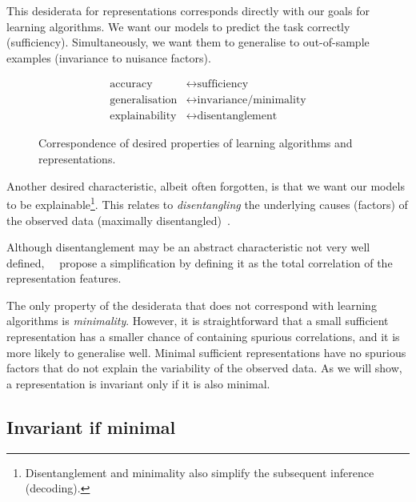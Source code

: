 This desiderata for representations corresponds directly with our goals for learning algorithms. We want our models to predict the task correctly (sufficiency). Simultaneously, we want them to generalise to out-of-sample examples (invariance to nuisance factors).

\begin{figure}[hbt]
    \begin{align*}
         \text{accuracy} &\leftrightarrow \text{sufficiency}\\
         \text{generalisation} &\leftrightarrow \text{invariance/minimality}\\
         \text{explainability} &\leftrightarrow \text{disentanglement}
    \end{align*}
    \caption{Correspondence of desired properties of learning algorithms and representations.}
    \end{figure}

Another desired characteristic, albeit often forgotten, is that we want our models to be explainable\footnote{Disentanglement and minimality also simplify the subsequent inference (decoding).}. This relates to \emph{disentangling} the underlying causes (factors) of the observed data (maximally disentangled)~\cite{goodfellow:2016}.

Although disentanglement may be an abstract characteristic not very well defined,~\citeauthor{achille:2017emergence}~\cite{achille:2017emergence} propose a simplification by defining it as the total correlation of the representation features.

The only property of the desiderata that does not correspond with learning algorithms is \emph{minimality}. However, it is straightforward that a small sufficient representation has a smaller chance of containing spurious correlations, and it is more likely to generalise well.  Minimal sufficient representations have no spurious factors that do not explain the variability of the observed data.  As we will show, a representation is invariant only if it is also minimal.

\subsection{Invariant if minimal}\label{sec:invariant_if_minimal}

